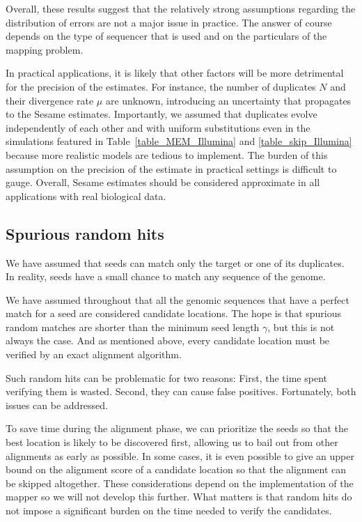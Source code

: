 \documentclass{article}
\begin{document}
Overall, these results suggest that the relatively strong assumptions
regarding the distribution of errors are not a major issue in practice.
The answer of course depends on the type of sequencer that is used and on
the particulars of the mapping problem.

In practical applications, it is likely that other factors will be more
detrimental for the precision of the estimates. For instance, the number
of duplicates $N$ and their divergence rate $\mu$ are unknown, introducing
an uncertainty that propagates to the Sesame estimates. Importantly, we
assumed that duplicates evolve independently of each other and with
uniform substitutions even in the simulations featured in
Table~\ref{table_MEM_Illumina} and \ref{table_skip_Illumina} because more
realistic models are tedious to implement. The burden of this assumption
on the precision of the estimate in practical settings is difficult to
gauge. Overall, Sesame estimates should be considered approximate in all
applications with real biological data.


\subsection{Spurious random hits}
\label{sec:random_seeds}

We have assumed that seeds can match only the target or one of its
duplicates. In reality, seeds have a small chance to match any sequence of
the genome.

We have assumed throughout that all the genomic sequences that have a
perfect match for a seed are considered candidate locations. The hope is
that spurious random matches are shorter than the minimum seed length
$\gamma$, but this is not always the case. And as mentioned above, every
candidate location must be verified by an exact alignment algorithm.

Such random hits can be problematic for two reasons: First, the time spent
verifying them is wasted. Second, they can cause false positives.
Fortunately, both issues can be addressed.

To save time during the alignment phase, we can prioritize the seeds so
that the best location is likely to be discovered first, allowing us to
bail out from other alignments as early as possible. In some cases, it is
even possible to give an upper bound on the alignment score of a candidate
location so that the alignment can be skipped altogether. These
considerations depend on the implementation of the mapper so we will not
develop this further. What matters is that random hits do not impose a
significant burden on the time needed to verify the candidates.
\end{document}
